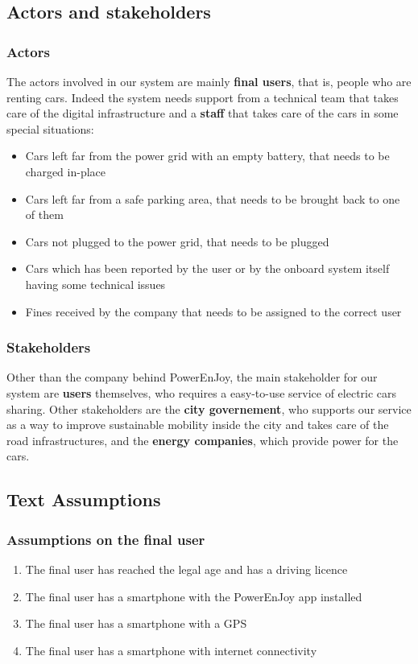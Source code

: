 \documentclass[11pt]{article} %
\newcommand{\pe}{PowerEnJoy }
\newcommand{\pecomma}{PowerEnJoy, }
\begin{document}
\subsection{Actors and stakeholders}

\subsubsection{Actors}
The actors involved in our system are mainly \textbf{final users}, that is, people who are renting cars. Indeed the system needs support from a technical team that takes care of the digital infrastructure and a \textbf{staff} that takes care of the cars in some special situations:
\begin{itemize} 
	\item Cars left far from the power grid with an empty battery, that needs to be charged in-place
	\item Cars left far from a safe parking area, that needs to be brought back to one of them
	\item Cars not plugged to the power grid, that needs to be plugged
	\item Cars which has been reported by the user or by the onboard system itself having some technical issues
	\item Fines received by the company that needs to be assigned to the correct user
\end{itemize}

\subsubsection{Stakeholders}
Other than the company behind \pecomma the main stakeholder for our system are \textbf{users} themselves, who requires a easy-to-use service of electric cars sharing. Other stakeholders are the \textbf{city governement}, who supports our service as a way to improve sustainable mobility inside the city and takes care of the road infrastructures, and the \textbf{energy companies}, which provide power for the cars.

\subsection{Text Assumptions}

\subsubsection{Assumptions on the final user}
\begin{enumerate}
	\item The final user has reached the legal age and has a driving licence
	\item The final user has a smartphone with the \pe app installed
	\item The final user has a smartphone with a GPS
	\item The final user has a smartphone with internet connectivity
\end{enumerate}
  
\end{document}
